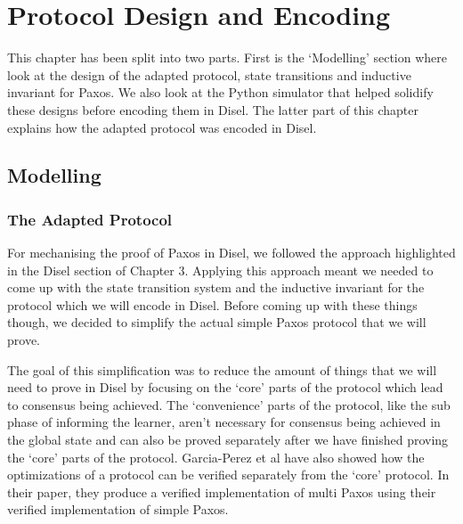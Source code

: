 \chapter{Protocol Design and Encoding}

This chapter has been split into two parts. First is the `Modelling'
section where look at the design of the adapted protocol, state transitions
and inductive invariant for Paxos. We also look at the Python simulator
that helped solidify these designs before encoding them in Disel.
The latter part of this chapter explains how the adapted protocol was
encoded in Disel.

\section{Modelling}

\subsection{The Adapted Protocol}
For mechanising the proof of Paxos in Disel, we followed the approach highlighted
in the Disel section of Chapter 3. Applying this approach meant
we needed to come up with the state transition system and the inductive invariant
for the protocol which we will encode in Disel. Before coming up with these things
though, we decided to simplify the actual simple Paxos protocol that we will prove.

The goal of this simplification was to reduce the amount of things that we will need
to prove in Disel by focusing on the `core' parts of the protocol which
lead to consensus being achieved. The `convenience' parts of the protocol, like
the sub phase of informing the learner, aren't necessary for consensus being
achieved in the global state and can also be proved separately after we have
finished proving the `core' parts of the protocol. Garcia-Perez et al \cite{6}
have also showed how the optimizations of a protocol can be verified separately
from the `core' protocol. In their paper, they produce a verified implementation
of multi Paxos using their verified implementation of simple Paxos.

